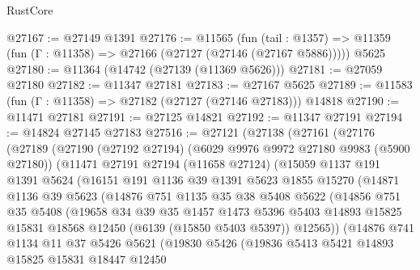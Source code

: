 \begin{lexlean}{RustCore}
\begin{coremodule}
@27167 := @27149 @1391
@27176 := @11565
    (fun (tail : @1357) => @11359 (fun (Γ : @11358) => @27166 (@27127 (@27146 (@27167 @5886)))))
    @5625
@27180 := @11364 (@14742 (@27139 (@11369 @5626)))
@27181 := @27059 @27180
@27182 := @11347 @27181
@27183 := @27167 @5625
@27189 := @11583 (fun (Γ : @11358) => @27182 (@27127 (@27146 @27183))) @14818
@27190 := @11471 @27181
@27191 := @27125 @14821
@27192 := @11347 @27191
@27194 := @14824 @27145 @27183
@27516 := @27121
    (@27138
      (@27161
        (@27176
          (@27189
            (@27190
              (@27192 @27194)
              (@6029 @9976 @9972 @27180 @9983 (@5900 @27180))
              (@11471
                @27191
                @27194
                (@11658 @27124)
                (@15059
                  @1137
                  @191
                  @1391
                  @5624
                  (@16151
                    @191
                    @1136
                    @39
                    @1391
                    @5623
                    @1855
                    @15270
                    (@14871
                      @1136
                      @39
                      @5623
                      (@14876
                        @751
                        @1135
                        @35
                        @38
                        @5408
                        @5622
                        (@14856
                          @751
                          @35
                          @5408
                          (@19658
                            @34
                            @39
                            @35
                            @1457
                            @1473
                            @5396
                            @5403
                            @14893
                            @15825
                            @15831
                            @18568
                            @12450
                            (@6139 (@15850 @5403 @5397))
                            @12565))
                        (@14876
                          @741
                          @1134
                          @11
                          @37
                          @5426
                          @5621
                          (@19830
                            @5426
                            (@19836
                              @5413
                              @5421
                              @14893
                              @15825
                              @15831
                              @18447
                              @12450

\end{coremodule}
\end{lexlean}
